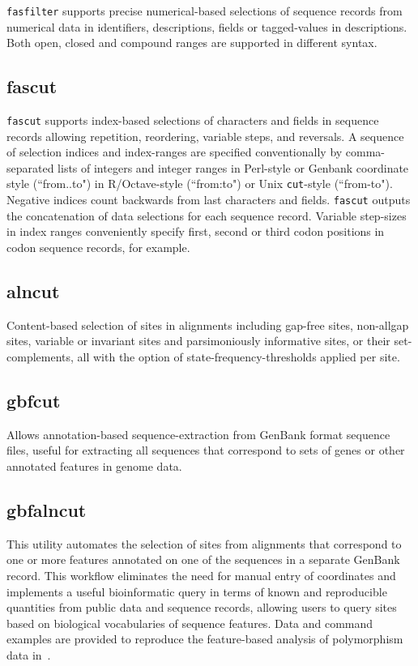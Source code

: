 \documentclass{frontiersSCNS} %
\begin{document}
{\tt fasfilter} supports precise numerical-based selections of
sequence records from numerical data in identifiers, descriptions, fields
or tagged-values in descriptions. Both open, closed and compound
ranges are supported in different syntax.

\subsection{fascut}

{\tt fascut} supports index-based selections of characters and fields
in sequence records allowing repetition, reordering, variable steps,
and reversals.  A sequence of selection indices and index-ranges are
specified conventionally by comma-separated lists of integers and
integer ranges in Perl-style or Genbank coordinate style (``from..to")
in R/Octave-style (``from:to") or Unix {\tt cut}-style
(``from-to"). Negative indices count backwards from last characters and
fields. {\tt fascut} outputs the concatenation of data selections for
each sequence record.  Variable step-sizes in index ranges
conveniently specify first, second or third codon positions in codon
sequence records, for example.

\subsection{alncut}
Content-based selection of sites in alignments including gap-free
sites, non-allgap sites, variable or invariant sites and
parsimoniously informative sites, or their set-complements, all with
the option of state-frequency-thresholds applied per site.

\subsection{gbfcut} 

Allows annotation-based sequence-extraction from GenBank format
sequence files, useful for extracting all sequences that correspond to
sets of genes or other annotated features in genome data.

\subsection{gbfalncut} 
This utility automates the selection of sites from alignments that
correspond to one or more features annotated on one of the sequences
in a separate GenBank record. This workflow eliminates the need for
manual entry of coordinates and implements a useful bioinformatic
query in terms of known and reproducible quantities from public data
and sequence records, allowing users to query sites based on
biological vocabularies of sequence features. Data and command
examples are provided to reproduce the feature-based analysis of
polymorphism data in~\citep{Ardell03}.
\end{document}
